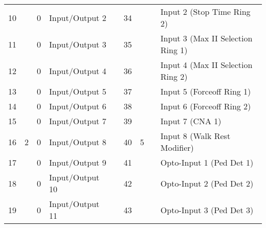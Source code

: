 \documentclass[]{article}
\begin{document}
\begin{landscape}
\begin{table}[]
\begin{tabular}{lllllllll}
			10           &                     & 0              & \cellcolor[HTML]{EFEFEF}Input/Output 2  &                    & 34           &                     &                & Input 2 (Stop Time Ring 2)                \\
			11           &                     & 0              & \cellcolor[HTML]{EFEFEF}Input/Output 3  &                    & 35           &                     &                & Input 3 (Max II Selection Ring 1)         \\
			12           &                     & 0              & \cellcolor[HTML]{EFEFEF}Input/Output 4  &                    & 36           &                     &                & Input 4 (Max II Selection Ring 2)         \\
			13           &                     & 0              & \cellcolor[HTML]{EFEFEF}Input/Output 5  &                    & 37           &                     &                & Input 5 (Forceoff Ring 1)                 \\
			14           &                     & 0              & \cellcolor[HTML]{EFEFEF}Input/Output 6  &                    & 38           &                     &                & Input 6 (Forceoff Ring 2)                 \\
			15           &                     & 0              & \cellcolor[HTML]{EFEFEF}Input/Output 7  &                    & 39           &                     &                & Input 7 (CNA 1)                           \\
			16           & \multirow{-8}{*}{2} & 0              & \cellcolor[HTML]{EFEFEF}Input/Output 8  &                    & 40           & \multirow{-8}{*}{5} &                & Input 8 (Walk Rest Modifier)              \\ \cline{1-4} \cline{6-9} 
			17           &                     & 0              & \cellcolor[HTML]{EFEFEF}Input/Output 9  &                    & 41           &                     &                & Opto-Input 1 (Ped Det 1)                  \\
			18           &                     & 0              & \cellcolor[HTML]{EFEFEF}Input/Output 10 &                    & 42           &                     &                & Opto-Input 2 (Ped Det 2)                  \\
			19           &                     & 0              & \cellcolor[HTML]{EFEFEF}Input/Output 11 &                    & 43           &                     &                & Opto-Input 3 (Ped Det 3)                  \\

\end{tabular}
\end{table}
\end{landscape}
\end{document}
